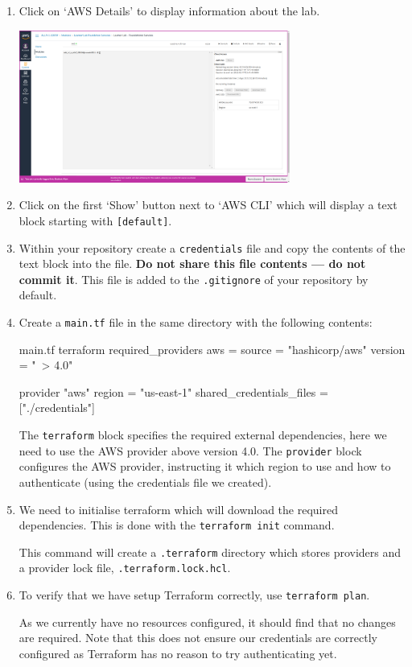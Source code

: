 \documentclass{csse4400}
\begin{document}
\begin{enumerate}
\item Click on `AWS Details' to display information about the lab.

\includegraphics[width=0.7\textwidth]{images/aws-details}

\item Click on the first `Show' button next to `AWS CLI' which will display a text block starting with \texttt{[default]}.
\item Within your repository create a \texttt{credentials} file and copy the contents of the text block into the file.
\textbf{Do not share this file contents --- do not commit it}.
This file is added to the \texttt{.gitignore} of your repository by default.
\item Create a \texttt{main.tf} file in the same directory with the following contents:
\begin{code}[language=terraform]{main.tf}
terraform {
    required_providers {
        aws = {
            source  = "hashicorp/aws"
            version = "~> 4.0"
        }
    }
}

provider "aws" {
    region = "us-east-1"
    shared_credentials_files = ["./credentials"]
}
\end{code}

The \texttt{terraform} block specifies the required external dependencies, here we need to use the AWS provider above version 4.0.
The \texttt{provider} block configures the AWS provider, instructing it which region to use and how to authenticate (using the credentials file we created).

\item We need to initialise terraform which will download the required dependencies.
    This is done with the \texttt{terraform init} command.

This command will create a \texttt{.terraform} directory which stores providers and a provider lock file, \texttt{.terraform.lock.hcl}.

\item To verify that we have setup Terraform correctly, use \texttt{terraform plan}.

As we currently have no resources configured, it should find that no changes are required.
Note that this does not ensure our credentials are correctly configured as Terraform has no reason to try authenticating yet.

\end{enumerate}
\end{document}

